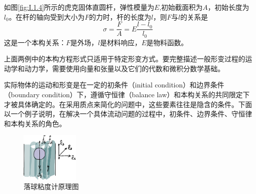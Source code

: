 \documentclass[main.tex]{subfiles}
\begin{document}
\begin{example}[轴向拉伸下的虎克固体本构关系]\label{exp:I.1.4}
    如图\ref{fig:I.1.4}所示的虎克固体直圆杆，弹性模量为$E$,初始截面积为$A$，初始长度为$l_0$。在杆的轴向受到大小为$F$的力时，杆的长度为$l$，则$F$与$l$的关系是
    \[
        \sigma=\frac{F}{A}=E\frac{l-l_0}{l_0}
    \]
    这是一个本构关系：$F$是外场，$l$是材料响应，$E$是物料函数。
\end{example}
上面两例中的本构方程形式只适用于特定形变方式。要完整描述一般形变过程的运动学和动力学，需要使用向量和张量以及它们的代数和微积分数学基础。

实际物体的运动和形变是在一定的初条件（initial condition）和边界条件（boundary condition）下，遵循守恒律（balance law）和本构关系的共同限定下才被具体确定的。在采用质点来简化的问题中，这些要素往往是隐含的条件。下面以一个例子说明，在解决一个具体流动问题的过程中，初条件、边界条件、守恒律和本构关系的角色。

\begin{figure}[h]
    \centering
    \includegraphics[width=0.25\textwidth]{images/I.1.5.eps}
    \caption{落球粘度计原理图}
    \label{fig:I.1.5}
\end{figure}
\end{document}
